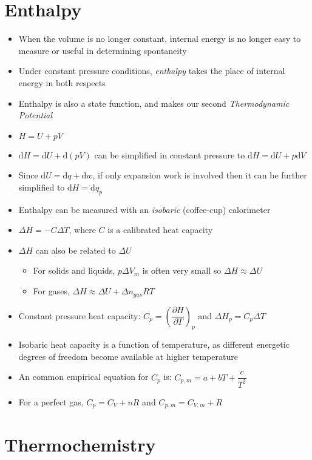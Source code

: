 \documentclass[12pt, openany, letterpaper]{memoir}
\begin{document}
\section{Enthalpy}
\begin{itemize}
	\item When the volume is no longer constant, internal energy is no longer easy to measure or useful in determining spontaneity
	\item Under constant pressure conditions, \emph{enthalpy} takes the place of internal energy in both respects
	\item Enthalpy is also a state function, and makes our second \emph{Thermodynamic Potential}
	\item $H = U + pV$
	\item $\mathrm{d}H = \mathrm{d}U + \mathrm{d}(pV)$ can be simplified in constant pressure to $\mathrm{d}H = \mathrm{d}U + p\mathrm{d}V$
	\item Since $\mathrm{d}U=\mathrm{d}q+\mathrm{d}w$, if only expansion work is involved then it can be further simplified to $\mathrm{d}H = \mathrm{d}q_p$
	\item Enthalpy can be measured with an \emph{isobaric} (coffee-cup) calorimeter
	\item $\Delta H = -C\Delta T$, where $C$ is a calibrated heat capacity
	\item $\Delta H$ can also be related to $\Delta U$
	\begin{itemize}
		\item For solids and liquids, $p\Delta V_m$ is often very small so $\Delta H \approx \Delta U$
		\item For gases, $\Delta H \approx \Delta U + \Delta n_{gas}RT$
	\end{itemize}
	\item Constant pressure heat capacity: $C_p = \left(\dfrac{\partial H}{\partial T}\right)_p$ and $\Delta H_p = C_p\Delta T$
	\item Isobaric heat capacity is a function of temperature, as different energetic degrees of freedom become available at higher temperature
	\item An common empirical equation for $C_p$ is: $C_{p,m} = a + bT + \dfrac{c}{T^2}$
	\item For a perfect gas, $C_p=C_V+nR$ and $C_{p,m}=C_{V,m}+R$
\end{itemize}

\section{Thermochemistry}
\end{document}
